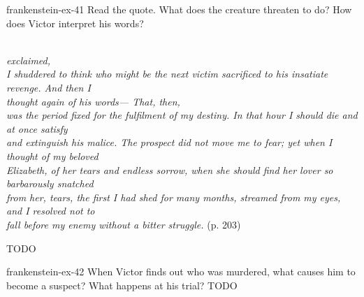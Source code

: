 \documentclass[preview]{standalone}
\begin{document}
\begin{snippetexercise}{frankenstein-ex-41}
    {Read the quote. What does the creature threaten to do? How does Victor interpret his words?}
    
    \begin{center}
        \\
        \textit{exclaimed, }\\
        \textit{I shuddered to think who might be the next victim sacrificed to his insatiate revenge. And then I}\\
        \textit{thought again of his words— That, then,}\\
        \textit{was the period fixed for the fulfilment of my destiny. In that hour I should die and at once satisfy}\\
        \textit{and extinguish his malice. The prospect did not move me to fear; yet when I thought of my beloved}\\
        \textit{Elizabeth, of her tears and endless sorrow, when she should find her lover so barbarously snatched}\\
        \textit{from her, tears, the first I had shed for many months, streamed from my eyes, and I resolved not to}\\
        \textit{fall before my enemy without a bitter struggle.} (p. 203)
    \end{center}
    
    TODO 
\end{snippetexercise}

\begin{snippetexercise}{frankenstein-ex-42}
    {When Victor finds out who was murdered, what causes him to become a suspect? What happens
    at his trial?}
    TODO 
\end{snippetexercise}
\end{document}
